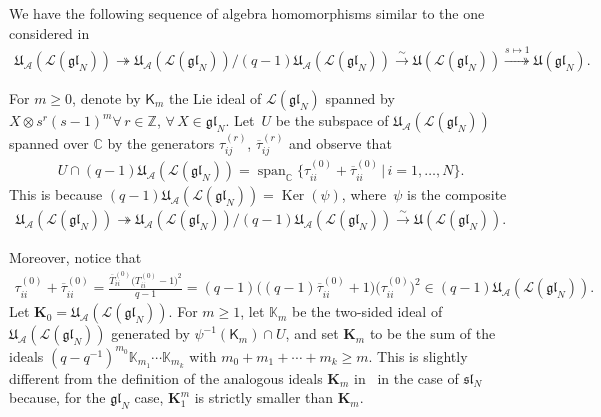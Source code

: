 \documentclass[11pt]{article}
\numberwithin{theorem}{section}
\numberwithin{proposition}{section}
\numberwithin{lemma}{section}
\numberwithin{corollary}{section}
\numberwithin{definition}{section}
\numberwithin{example}{section}
\numberwithin{remark}{section}
\numberwithin{note}{section}
\DeclareMathOperator{\Ker}{Ker}
\numberwithin{equation}{section}
\begin{document}
We have the following sequence of algebra homomorphisms similar to the one considered in~\cite{GuMa}
\begin{gather*}
\mathfrak{U}_{\mathcal{A}}(\mathcal{L}(\mathfrak{gl}_N)) \twoheadrightarrow
\mathfrak{U}_{\mathcal{A}}(\mathcal{L}(\mathfrak{gl}_N)) /
(q-1)\mathfrak{U}_{\mathcal{A}}(\mathcal{L}(\mathfrak{gl}_N)) \stackrel{\sim}{\longrightarrow}
\mathfrak{U}(\mathcal{L}(\mathfrak{gl}_N)) \stackrel{s\mapsto 1}{\twoheadrightarrow}
\mathfrak{U}(\mathfrak{gl}_N).
\end{gather*}



For $m\ge 0$, denote by $\mathsf{K}_m$ the Lie ideal of $\mathcal{L}(\mathfrak{gl}_N)$
spanned by $X\otimes s^r (s-1)^m \forall\, r\in\mathbb{Z}$, $\forall\, X\in\mathfrak{gl}_N$.
Let~$U$ be the subspace of $\mathfrak{U}_{\mathcal{A}}(\mathcal{L}(\mathfrak{gl}_N))$ spanned over
$\mathbb{C}$ by the generators $\tau_{ij}^{(r)}$, $\overline{\tau}_{ij}^{(r)}$ and observe that
 \begin{gather*}
 U \cap (q-1){\mathfrak{U}}_{\mathcal{A}}({\mathcal{L}}({\mathfrak{gl}}_N))
 = \operatorname{span}_{\mathbb{C}} \big\{\tau_{ii}^{(0)}
 +\overline{\tau}_{ii}^{(0)} \,\big|\, i=1,\ldots,N\big\}.
\end{gather*}
This is because $(q-1)\mathfrak{U}_{\mathcal{A}}(\mathcal{L}(\mathfrak{gl}_N))=\Ker(\psi)$,
where~$\psi$ is the composite
\begin{gather*}
\mathfrak{U}_{\mathcal{A}}(\mathcal{L}(\mathfrak{gl}_N)) \twoheadrightarrow
\mathfrak{U}_{\mathcal{A}}(\mathcal{L}(\mathfrak{gl}_N)) /
(q-1)\mathfrak{U}_{\mathcal{A}}(\mathcal{L}(\mathfrak{gl}_N)) \stackrel{\sim}{\longrightarrow}
\mathfrak{U}(\mathcal{L}(\mathfrak{gl}_N)).
\end{gather*}

Moreover, notice that
\begin{gather*}
\tau_{ii}^{(0)}+\overline{\tau}_{ii}^{(0)} = \frac{\overline{T}_{ii}^{(0)}\big(T_{ii}^{(0)}-1\big)^2}{q-1} = (q-1)
\big((q-1)\overline{\tau}_{ii}^{(0)}+1\big) \big(\tau_{ii}^{(0)}\big)^2 \in
(q-1)\mathfrak{U}_{\mathcal{A}}(\mathcal{L}(\mathfrak{gl}_N)).
\end{gather*}
Let $\mathbf{K}_0 = \mathfrak{U}_{\mathcal{A}}(\mathcal{L}(\mathfrak{gl}_N))$.
For $m \geq 1$, let $\mathbb{K}_m$ be the two-sided ideal of
$\mathfrak{U}_{\mathcal{A}}(\mathcal{L}(\mathfrak{gl}_N))$ generated by $\psi^{-1}(\mathsf{K}_m) \cap U$, and
set $\mathbf{K}_m$ to be the sum of the ideals $(q-q^{-1})^{m_0}\mathbb{K}_{m_1} \cdots \mathbb{K}_{m_k}$ with $m_0 + m_1
+ \cdots + m_k \ge m$.
This is slightly dif\/ferent from the def\/inition of the analogous ideals $\mathbf{K}_m$ in~\cite{GuMa} in the case of
$\mathfrak{s}\mathfrak{l}_N$ because, for the $\mathfrak{gl}_N$ case, $\mathbf{K}_1^m$ is strictly smaller
than $\mathbf{K}_m$.
\end{document}
